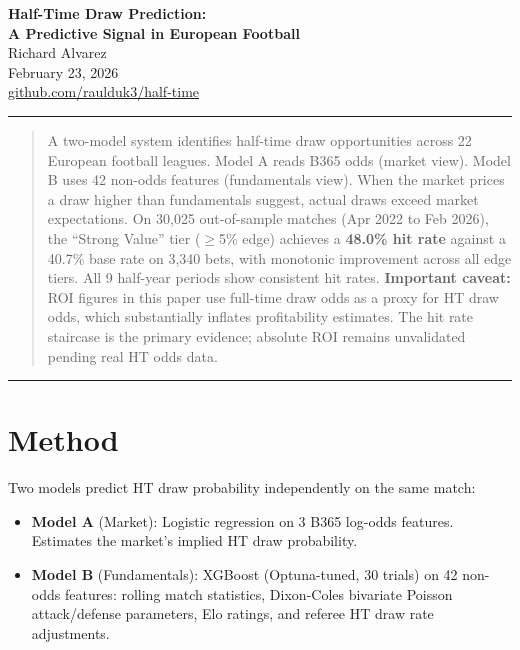 \documentclass[11pt, letterpaper]{article}
\begin{document}
\begin{center}
{\color{accent}\LARGE\bfseries Half-Time Draw Prediction:\\[4pt] A Predictive Signal in European Football}\\[12pt]
{\large Richard Alvarez}\\[4pt]
{\color{dimgray} February 23, 2026}\\[2pt]
{\color{dimgray}\small\href{https://github.com/raulduk3/half-time}{github.com/raulduk3/half-time}}
\end{center}

\vspace{8pt}
\noindent\rule{\textwidth}{0.4pt}

\begin{quote}
\color{dimgray}\small
A two-model system identifies half-time draw opportunities across 22 European football leagues. Model A reads B365 odds (market view). Model B uses 42 non-odds features (fundamentals view). When the market prices a draw higher than fundamentals suggest, actual draws exceed market expectations. On 30,025 out-of-sample matches (Apr 2022 to Feb 2026), the ``Strong Value'' tier ($\geq$5\% edge) achieves a \textbf{48.0\% hit rate} against a 40.7\% base rate on 3,340 bets, with monotonic improvement across all edge tiers. All 9 half-year periods show consistent hit rates. \textbf{Important caveat:} ROI figures in this paper use full-time draw odds as a proxy for HT draw odds, which substantially inflates profitability estimates. The hit rate staircase is the primary evidence; absolute ROI remains unvalidated pending real HT odds data.
\end{quote}

\vspace{-4pt}
\noindent\rule{\textwidth}{0.4pt}
\vspace{6pt}

\section{Method}

Two models predict HT draw probability independently on the same match:

\begin{itemize}[leftmargin=1.5em, itemsep=2pt]
  \item \textbf{Model A} (Market): Logistic regression on 3 B365 log-odds features. Estimates the market's implied HT draw probability.
  \item \textbf{Model B} (Fundamentals): XGBoost (Optuna-tuned, 30 trials) on 42 non-odds features: rolling match statistics, Dixon-Coles bivariate Poisson attack/defense parameters, Elo ratings, and referee HT draw rate adjustments.
\end{itemize}
\end{document}
